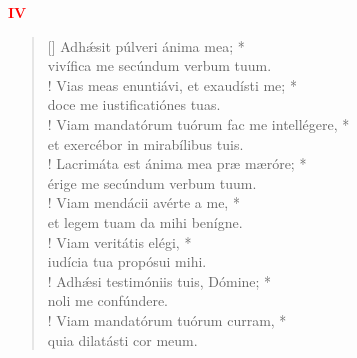 \begin{center}
\textcolor{red}{\bf IV}\\
\end{center}
\begin{verse}[\versewidth]
Adh\'{æ}sit púlveri ánima mea; *\\
vivífica me secúndum verbum tuum.\\!
\vin Vias meas enuntiávi, et exaudísti me; *\\
\vin doce me iustificatiónes tuas.\\!
Viam mandatórum tuórum fac me intellégere, *\\
et exercébor in mirabílibus tuis.\\!
\vin Lacrimáta est ánima mea præ mæróre; *\\
\vin érige me secúndum verbum tuum.\\!
Viam mendácii avérte a me, *\\
et legem tuam da mihi benígne.\\!
\vin Viam veritátis elégi, *\\
\vin iudícia tua propósui mihi.\\!
Adh\'{æ}si testimóniis tuis, Dómine; *\\
noli me confúndere.\\!
\vin Viam mandatórum tuórum curram, *\\
\vin quia dilatásti cor meum.\\
\end{verse}
\vspace{1cm}


